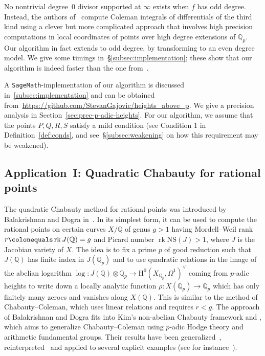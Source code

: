 \documentclass[11pt, a4paper]{amsart}
\newcommand{\Q}{\mathbb{Q}}
\newcommand{\rk}{\operatorname{rk}}
\theoremstyle{remark}
\numberwithin{equation}{section}
\newcommand{\sg}{{}}
\begin{document}
No nontrivial degree~0 divisor supported at $\infty$ exists when $f$ has odd degree.
Instead, the authors of~\cite{BBHeights}  compute Coleman
integrals of differentials of the third kind  using a clever but 
more complicated 
approach that involves high precision computations in 
local coordinates of points over high degree extensions of
$\Q_p$.
Our algorithm in fact extends to odd degree, by transforming to an even degree model. 
We give some timings in~\S\ref{subsec:implementation}; these show that our algorithm
is indeed faster than the one from~\cite{BBHeights}.  

A {\tt SageMath}-implementation of our algorithm is discussed
in~\cref{subsec:implementation} and can be obtained 
from~{\url{https://github.com/StevanGajovic/heights_above_p}}. 
We give a precision analysis in Section~\ref{sec:prec-p-adic-heights}.
For our algorithm, we assume that the points $P,Q,R,S$ satisfy a mild condition
(see \sg{Condition 1 in Definition~\ref{def:conds}}, and see~\S\ref{subsec:weakening} on how this 
requirement may be weakened).

\subsection{Application~I: Quadratic Chabauty for rational points}\label{subsec:qcrat}
  The quadratic Cha\-bauty method for rational points was introduced by
  Balakrishnan and Dogra in~\cite{Jen-Netan-QCRP1}. In its simplest form,
  it  can be used to
  compute the rational points on certain curves $X/\Q$ of genus $g>1$
  having Mordell--Weil rank
  $r\colonequals \rk J(\Q) =g$ and Picard number $\rk\mathrm{NS}(J)>1$, 
  where $J$ is the Jacobian variety of $X$. 
The idea is to fix a prime $p$ of good reduction such that $J(\Q)$ has finite index in $J(\Q_p)$
and to use quadratic relations in the image
of the abelian logarithm $\log\colon J(\Q)\otimes \Q_p\to
\mathrm{H}^0(X_{\Q_p},\Omega^1)^\vee$ coming from $p$-adic heights to write down a locally analytic function $\rho\colon X(\Q_p)\to \Q_p$ which has only
finitely many zeroes and vanishes along $X(\Q)$. This is similar to the
method of Chabauty--Coleman, which uses linear relations and requires
$r<g$.
  The approach of Balakrishnan and Dogra fits into Kim's non-abelian
  Chabauty framework  \cite{Kim2005MFG} and \cite{Kim2009Selmer}, which
  aims to generalize Chabauty--Coleman using $p$-adic Hodge theory
  and arithmetic fundamental groups.
  Their results have  been
  generalized~\cite{Jen-Netan-QCRP2}, reinterpreted~\cite{EL19, BMS21} and 
  applied to several explicit examples (see for instance~\cite{QC13, BBBLMTV19, AABCCKW}).
\end{document}
